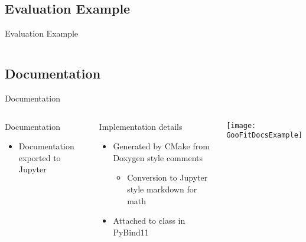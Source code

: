 \documentclass[aspectratio=169, smaller]{beamer}
\begin{document}
\subsection{Evaluation Example}
\begin{frame}{Evaluation Example}
    \begin{columns}
    \end{columns}
\end{frame}

\subsection{Documentation}
\begin{frame}[fragile]{Documentation}
    \begin{columns}[c]
        \begin{block}{Documentation}
            \begin{itemize}
                \item Documentation exported to Jupyter
            \end{itemize}
        \end{block}
        \begin{block}{Implementation details}
            \begin{itemize}
                \item Generated by CMake from Doxygen style comments
                \begin{itemize}
                    \item Conversion to Jupyter style markdown for math
                \end{itemize}
                \item Attached to class in PyBind11
            \end{itemize}
        \end{block}

        \texttt{[image: GooFitDocsExample]}
    \end{columns}
\end{frame}
\end{document}
